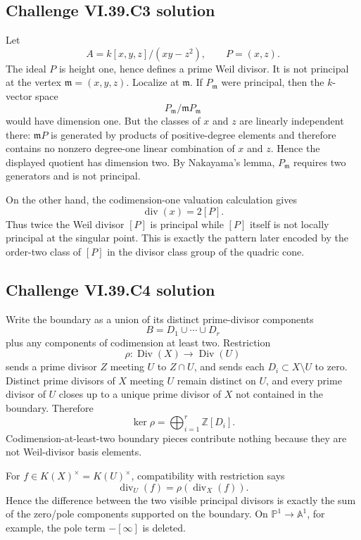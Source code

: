 \subsection*{Challenge VI.39.C3 solution}
\begin{solution}
Let
\[
 A=k[x,y,z]/(xy-z^2),\qquad P=(x,z).
\]
The ideal \(P\) is height one, hence defines a prime Weil divisor.  It is not principal at the vertex \(\mathfrak m=(x,y,z)\).  Localize at \(\mathfrak m\).  If \(P_{\mathfrak m}\) were principal, then the \(k\)-vector space
\[
 P_{\mathfrak m}/\mathfrak mP_{\mathfrak m}
\]
would have dimension one.  But the classes of \(x\) and \(z\) are linearly independent there: \(\mathfrak mP\) is generated by products of positive-degree elements and therefore contains no nonzero degree-one linear combination of \(x\) and \(z\).  Hence the displayed quotient has dimension two.  By Nakayama's lemma, \(P_{\mathfrak m}\) requires two generators and is not principal.

On the other hand, the codimension-one valuation calculation gives
\[
 \operatorname{div}(x)=2[P].
\]
Thus twice the Weil divisor \([P]\) is principal while \([P]\) itself is not locally principal at the singular point.  This is exactly the pattern later encoded by the order-two class of \([P]\) in the divisor class group of the quadric cone.
\end{solution}

\subsection*{Challenge VI.39.C4 solution}
\begin{solution}
Write the boundary as a union of its distinct prime-divisor components
\[
 B=D_1\cup\cdots\cup D_r
\]
plus any components of codimension at least two.  Restriction
\[
 \rho:\operatorname{Div}(X)\longrightarrow\operatorname{Div}(U)
\]
sends a prime divisor \(Z\) meeting \(U\) to \(Z\cap U\), and sends each \(D_i\subset X\setminus U\) to zero.  Distinct prime divisors of \(X\) meeting \(U\) remain distinct on \(U\), and every prime divisor of \(U\) closes up to a unique prime divisor of \(X\) not contained in the boundary.  Therefore
\[
 \ker\rho=\bigoplus_{i=1}^r\mathbb Z[D_i].
\]
Codimension-at-least-two boundary pieces contribute nothing because they are not Weil-divisor basis elements.

For \(f\in K(X)^\times=K(U)^\times\), compatibility with restriction says
\[
 \operatorname{div}_U(f)=\rho(\operatorname{div}_X(f)).
\]
Hence the difference between the two visible principal divisors is exactly the sum of the zero/pole components supported on the boundary.  On \(\mathbb P^1\to\mathbb A^1\), for example, the pole term \(-[\infty]\) is deleted.
\end{solution}

